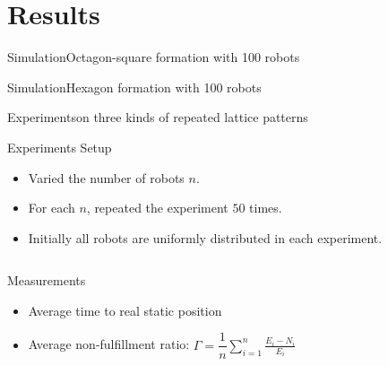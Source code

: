 \documentclass[10pt]{beamer}
\begin{document}
\section{Results}
\begin{frame}{Simulation}{Octagon-square formation with 100 robots}
  \begin{center}
  \end{center}
\end{frame}
\begin{frame}{Simulation}{Hexagon formation with 100 robots}
  \begin{center}
  \end{center}
\end{frame}

\begin{frame}{Experiments}{on three kinds of repeated
    lattice patterns}
  \begin{block}{Experiments Setup}
    \begin{itemize}
    \item Varied the number of robots $n$.
    \item For each $n$, repeated the experiment $50$ times.
    \item Initially all robots are uniformly distributed in each experiment.
    \end{itemize}
  \end{block}
  
    \begin{columns}
      \begin{column}{.6\textwidth}
        \begin{block}{Measurements}
          \begin{itemize}
          \item Average time to real static position
          \item Average non-fulfillment ratio: $\Gamma =
            \dfrac{1}{n}\sum\limits_{i=1}^n \frac{E_i - N_i}{E_i}$
          \end{itemize}
        \begin{figure}
          \centering
        \end{figure}
      \end{block}
      \end{column}
      \begin{column}{.3\textwidth}
        
      \end{column}
    \end{columns} 
\end{frame}
\end{document}
